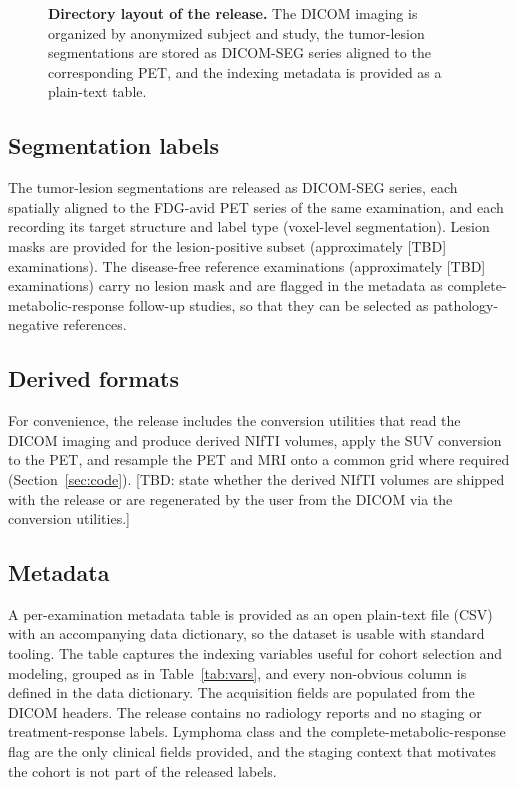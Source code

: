 \begin{figure}[t]
\centering
{}
\caption{\textbf{Directory layout of the release.}
The DICOM imaging is organized by anonymized subject and study, the tumor-lesion segmentations are stored as DICOM-SEG series aligned to the corresponding PET, and the indexing metadata is provided as a plain-text table.}
\label{fig:layout}
\end{figure}

\subsection*{Segmentation labels}\label{subsec:labels}
The tumor-lesion segmentations are released as DICOM-SEG series, each spatially aligned to the FDG-avid PET series of the same examination, and each recording its target structure and label type (voxel-level segmentation).
Lesion masks are provided for the lesion-positive subset (approximately [TBD] examinations).
The disease-free reference examinations (approximately [TBD] examinations) carry no lesion mask and are flagged in the metadata as complete-metabolic-response follow-up studies, so that they can be selected as pathology-negative references.

\subsection*{Derived formats}\label{subsec:derived}
For convenience, the release includes the conversion utilities that read the DICOM imaging and produce derived NIfTI volumes, apply the SUV conversion to the PET, and resample the PET and MRI onto a common grid where required (Section~\ref{sec:code}).
[TBD: state whether the derived NIfTI volumes are shipped with the release or are regenerated by the user from the DICOM via the conversion utilities.]

\subsection*{Metadata}\label{subsec:metadata}
A per-examination metadata table is provided as an open plain-text file (CSV) with an accompanying data dictionary, so the dataset is usable with standard tooling.
The table captures the indexing variables useful for cohort selection and modeling, grouped as in Table~\ref{tab:vars}, and every non-obvious column is defined in the data dictionary.
The acquisition fields are populated from the DICOM headers.
The release contains no radiology reports and no staging or treatment-response labels.
Lymphoma class and the complete-metabolic-response flag are the only clinical fields provided, and the staging context that motivates the cohort is not part of the released labels.

